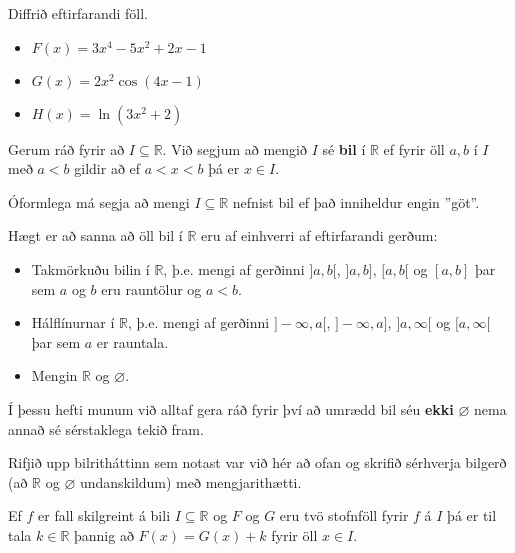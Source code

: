 \begin{æd}
Diffrið eftirfarandi föll.
\begin{itemize}
\item[a)] $F(x) = 3x^4-5x^2+2x-1$

\item[b)] $G(x) = 2x^{2}\cos\left(4x-1\right)$

\item[c)] $H(x) = \ln\left(3x^{2}+2\right)$
\end{itemize}
\end{æd}

\begin{skilgr}{}
Gerum ráð fyrir að $I \subseteq \mathbb{R}$. Við segjum að mengið $I$ sé \textbf{bil} í $\mathbb{R}$ ef fyrir öll $a,b$ í $I$ með $a < b$ gildir að ef $a < x < b$ þá er $x \in I$.
\end{skilgr}

\begin{ath}
Óformlega má segja að mengi $I \subseteq \mathbb{R}$ nefnist bil ef það inniheldur engin ''göt''.
\end{ath}

\begin{ath}
Hægt er að sanna að öll bil í $\mathbb{R}$ eru af einhverri af eftirfarandi gerðum:
\begin{itemize}
\item[1)] Takmörkuðu bilin í $\mathbb{R}$, þ.e. mengi af gerðinni $]a,b[$, $]a,b]$, $[a,b[$ og $[a,b]$ þar sem $a$ og $b$ eru rauntölur og $a < b$.
\item[2)] Hálflínurnar í $\mathbb{R}$, þ.e. mengi af gerðinni $]-\infty,a[$, $]-\infty,a]$, $]a,\infty[$ og $[a,\infty[$ þar sem $a$ er rauntala.
\item[3)] Mengin $\mathbb{R}$ og $\varnothing$.
\end{itemize}
\end{ath}

\begin{ath}
Í þessu hefti munum við alltaf gera ráð fyrir því að umrædd bil séu \textbf{ekki} $\varnothing$ nema annað sé sérstaklega tekið fram.
\end{ath}

\begin{æd}
Rifjið upp bilritháttinn sem notast var við hér að ofan og skrifið sérhverja bilgerð (að $\mathbb{R}$ og $\varnothing$ undanskildum) með mengjarithætti.
\end{æd}

\begin{regla}{}
Ef $f$ er fall skilgreint á bili $I \subseteq \mathbb{R}$ og $F$ og $G$ eru tvö stofnföll fyrir $f$ á $I$ þá er til tala $k \in \mathbb{R}$ þannig að $F(x) = G(x) + k$ fyrir öll $x \in I$.
\end{regla}

